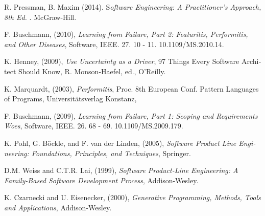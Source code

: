 {\begin{latin}
\begin{thebibliography}{9}

	R. Pressman,   B. Maxim (2014).
	S\textit{oftware Engineering: A Practitioner’s Approach, 8th Ed. }.
	McGraw-Hill.

	
	
	F. Buschmann, (2010), \textit{Learning from Failure, Part 2: Featuritis, Performitis, and Other Diseases}, Software, IEEE. 27. 10 - 11. 10.1109/MS.2010.14. 
	
	
	K. Henney, (2009), \textit{Use Uncertainty as a Driver}, 97 Things Every Software Architect Should Know, R. Monson-Haefel, ed., O’Reilly.
	
	K. Marquardt, (2003), \textit{Performitis}, Proc. 8th European Conf. Pattern Languages of Programs, Universitätsverlag Konstanz,

F. Buschmann, (2009), \textit{Learning from Failure, Part 1: Scoping and Requirements Woes}, Software, IEEE. 26. 68 - 69. 10.1109/MS.2009.179. 
	
K. Pohl, G. Böckle, and F. van der Linden, (2005), \textit{Software Product Line Engineering: Foundations, Principles, and Techniques}, Springer.
	
	
	D.M. Weiss and C.T.R. Lai, (1999), \textit{Software Product-Line Engineering: A Family-Based Software Development Process}, Addison-Wesley.
	
	K. Czarnecki and U. Eisenecker, (2000), \textit{Generative Programming, Methods, Tools and Applications}, Addison-Wesley.

	 

	  

	 
	
	
\end{thebibliography}
\endgroup
\end{latin}

}
